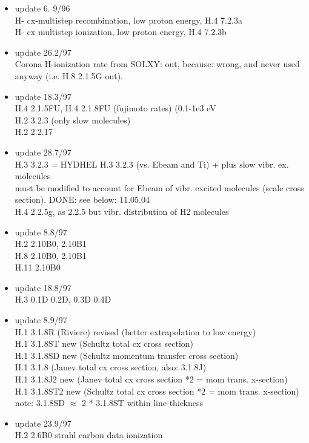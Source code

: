 \documentclass[12pt,dvipdfmx]{article}
\begin{document}
\begin{itemize}
 \item update   6. 9/96 \\
   H- cx-multistep recombination, low proton energy, H.4  7.2.3a\\
   H- cx multistep ionization, low proton energy, H.4  7.2.3b
 \item update   26.2/97 \\
   Corona H-ionization rate from SOLXY: out, because:
   wrong, and never used anyway
(i.e. H.8 2.1.5G out).
 \item update   18.3/97 \\
  H.4 2.1.5FU, H.4 2.1.8FU (fujimoto rates) (0.1-1e3 eV\\
  H.2 3.2.3  (only slow molecules) \\
  H.2 2.2.17
 \item update   28.7/97 \\
  H.3 3.2.3  = HYDHEL H.3 3.2.3 (vs. Ebeam and Ti) + plus
  slow vibr. ex. molecules\\
  must be modified to account for Ebeam of vibr. excited
  molecules (scale cross section). DONE: see below: 11.05.04\\
  H.4 2.2.5g, as 2.2.5 but vibr. distribution of H2 molecules
 \item update    8.8/97 \\
  H.2 2.10B0, 2.10B1 \\
  H.8 2.10B0, 2.10B1 \\
  H.11 2.10B0
 \item update   18.8/97 \\
  H.3 0.1D  0.2D, 0.3D 0.4D \\
 \item update    8.9/97 \\
  H.1 3.1.8R (Riviere) revised (better extrapolation to low energy) \\
  H.1 3.1.8ST new (Schultz total cx cross section) \\
  H.1 3.1.8SD new (Schultz momentum transfer cross section) \\
  H.1 3.1.8       (Janev total cx cross section, also: 3.1.8J)\\
  H.1 3.1.8J2 new (Janev total cx cross section *2 = mom trans. x-section)\\
  H.1 3.1.8ST2 new (Schultz total cx cross section *2 = mom trans. x-section)\\
  note: 3.1.8SD $\approx$ 2  * 3.1.8ST within line-thickness
 \item update   23.9/97 \\
  H.2 2.6B0 strahl carbon data ionization\\

\end{itemize}
\end{document}
